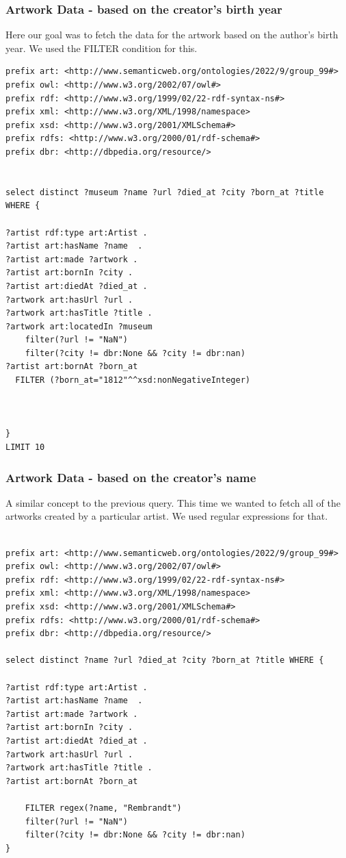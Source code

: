 \documentclass{article}
\begin{document}
\subsubsection{Artwork Data - based on the creator's birth year}

Here our goal was to fetch the data for the artwork based on the author's birth year. We used the FILTER condition for this. 

\begin{verbatim}
prefix art: <http://www.semanticweb.org/ontologies/2022/9/group_99#> 
prefix owl: <http://www.w3.org/2002/07/owl#>
prefix rdf: <http://www.w3.org/1999/02/22-rdf-syntax-ns#> 
prefix xml: <http://www.w3.org/XML/1998/namespace> 
prefix xsd: <http://www.w3.org/2001/XMLSchema#> 
prefix rdfs: <http://www.w3.org/2000/01/rdf-schema#> 
prefix dbr: <http://dbpedia.org/resource/>


select distinct ?museum ?name ?url ?died_at ?city ?born_at ?title WHERE { 

?artist rdf:type art:Artist .
?artist art:hasName ?name  .
?artist art:made ?artwork .
?artist art:bornIn ?city .
?artist art:diedAt ?died_at .
?artwork art:hasUrl ?url .
?artwork art:hasTitle ?title .
?artwork art:locatedIn ?museum
    filter(?url != "NaN") 
    filter(?city != dbr:None && ?city != dbr:nan)
?artist art:bornAt ?born_at
  FILTER (?born_at="1812"^^xsd:nonNegativeInteger)



} 
LIMIT 10
\end{verbatim}

\subsubsection{Artwork Data - based on the creator's name}

A similar concept to the previous query. This time we wanted to fetch all of the artworks created by a particular artist. We used regular expressions for that. 

\begin{verbatim}

prefix art: <http://www.semanticweb.org/ontologies/2022/9/group_99#>
prefix owl: <http://www.w3.org/2002/07/owl#>
prefix rdf: <http://www.w3.org/1999/02/22-rdf-syntax-ns#>
prefix xml: <http://www.w3.org/XML/1998/namespace>
prefix xsd: <http://www.w3.org/2001/XMLSchema#>
prefix rdfs: <http://www.w3.org/2000/01/rdf-schema#>
prefix dbr: <http://dbpedia.org/resource/>

select distinct ?name ?url ?died_at ?city ?born_at ?title WHERE {
    
?artist rdf:type art:Artist .
?artist art:hasName ?name  .
?artist art:made ?artwork .
?artist art:bornIn ?city .
?artist art:diedAt ?died_at .
?artwork art:hasUrl ?url .
?artwork art:hasTitle ?title .
?artist art:bornAt ?born_at

    FILTER regex(?name, "Rembrandt")
    filter(?url != "NaN")
    filter(?city != dbr:None && ?city != dbr:nan)
}
\end{verbatim}
\end{document}
